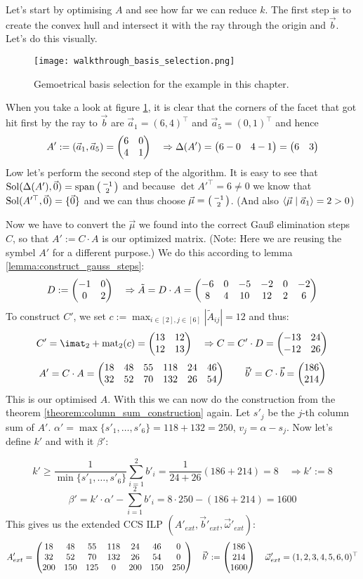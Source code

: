 Let's start by optimising $A$ and see how far we can reduce $k$. The first step is to create the convex hull and intersect it with the ray through the origin and $\vec b$. Let's do this visually.
\begin{figure}
    \centering
    \texttt{[image: walkthrough\_basis\_selection.png]}
    \caption{\label{fig:walkthrough_basis_selection} Gemoetrical basis selection for the example in this chapter.}
\end{figure}
When you take a look at figure \ref{fig:walkthrough_basis_selection}, it is clear that the corners of the facet that got hit first by the ray to $\vec b$ are $\vec a_1 = (6, 4)^\top$ and $\vec a_5 = (0, 1)^\top$ and hence
$$A' := (\vec a_1, \vec a_5) = \left(\begin{matrix}6&0\\4&1\end{matrix}\right) \quad \Rightarrow \Delta(A') = \left(\begin{matrix}6-0&4-1\end{matrix}\right) = \left(\begin{matrix}6&3\end{matrix}\right)$$
Low let's perform the second step of the algorithm. It is easy to see that $\operatorname{Sol}(\Delta(A'), \vec 0) = \operatorname{span}\left(\begin{smallmatrix}-1\\2\end{smallmatrix}\right)$ and because $\det A'^\top = 6 \neq 0$ we know that $\operatorname{Sol}(A'^\top, \vec 0) = \{\vec 0\}$ and we can thus choose $\vec\mu = \left(\begin{smallmatrix}-1\\2\end{smallmatrix}\right)$. (And also $\langle \vec\mu \mid \vec a_1 \rangle = 2 > 0$)

Now we have to convert the $\vec\mu$ we found into the correct Gauß elimination steps $C$, so that $A' := C\cdot A$ is our optimized matrix. (Note: Here we are reusing the symbel $A'$ for a different purpose.) We do this according to lemma \ref{lemma:construct_gauss_steps}:
$$D := \left(\begin{matrix}-1&0\\0&2\end{matrix}\right) \quad\Rightarrow \tilde A = D \cdot A = \left(\begin{matrix}-6&0&-5&-2&0&-2\\8&4&10&12&2&6\end{matrix}\right)$$
To construct $C'$, we set $c := \max_{i\in[2], j\in[6]}|\tilde A_{ij}| = 12$ and thus:
$$C' = \imat_2 + \opmat_2(c) = \mat{13&12\\12&13} \quad\Rightarrow C = C'\cdot D = \mat{-13&24\\-12&26}$$
$$A' = C \cdot A = \left(\begin{matrix}18&48&55&118&24&46\\32&52&70&132&26&54\end{matrix}\right)\qquad \vec b' = C\cdot \vec b = \left(\begin{matrix}186\\214\end{matrix}\right)$$
This is our optimised $A$. With this we can now do the construction from the theorem \ref{theorem:column_sum_construction} again. Let $s'_j$ be the $j$-th column sum of $A'$. $\alpha' = \max\{s'_1, \dots, s'_6\} = 118+132=250$, $v_j = \alpha - s_j$. Now let's define $k'$ and with it $\beta'$:

$$k' \geq \frac{1}{\min\{s'_1, \dots, s'_6\}} \sum_{i=1}^{2}b'_i = \frac{1}{24+26}(186+214) = 8 \quad \Rightarrow k' := 8$$ 
$$\beta' = k'\cdot\alpha' - \sum_{i=1}^{2}b'_i = 8\cdot250-(186+214) = 1600$$
This gives us the extended CCS ILP $(A'_{ext}, \vec b'_{ext}, \vec\omega'_{ext})$:
$$A'_{ext} = \left(\begin{matrix}18&48&55&118&24&46&0\\32&52&70&132&26&54&0\\200&150&125&0&200&150&250\end{matrix}\right)\quad\vec b':= \left(\begin{matrix}186\\214\\1600\end{matrix}\right)\quad \vec\omega'_{ext} = (1, 2, 3, 4, 5, 6, 0)^\top$$

